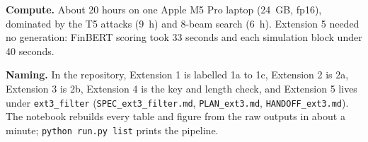\documentclass[12pt,letterpaper]{article}
\begin{document}
\textbf{Compute.} About 20 hours on one Apple M5 Pro laptop (24~GB, fp16), dominated by the T5 attacks (9~h) and 8-beam search (6~h). Extension 5 needed no generation: FinBERT scoring took 33 seconds and each simulation block under 40 seconds.

\textbf{Naming.} In the repository, Extension 1 is labelled 1a to 1c, Extension 2 is 2a, Extension 3 is 2b, Extension 4 is the key and length check, and Extension 5 lives under \texttt{ext3\_filter} (\texttt{SPEC\_ext3\_filter.md}, \texttt{PLAN\_ext3.md}, \texttt{HANDOFF\_ext3.md}). The notebook rebuilds every table and figure from the raw outputs in about a minute; \texttt{python run.py list} prints the pipeline.
\end{document}

